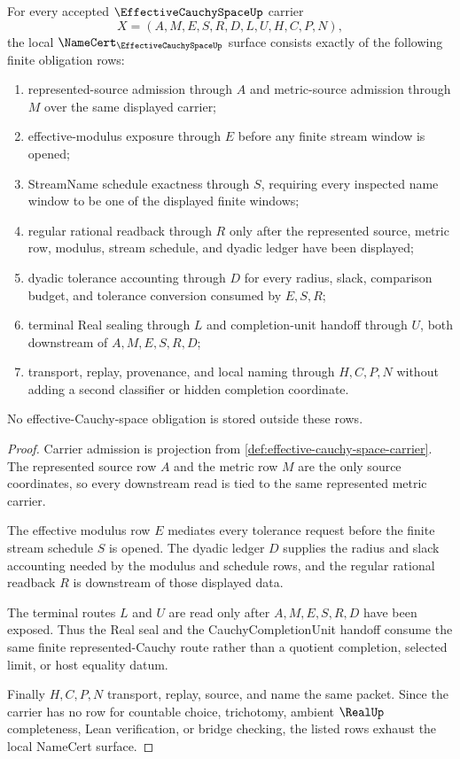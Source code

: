 \begin{theorem}\label{thm:effective-cauchy-space-namecert-obligations}
For every accepted $\EffectiveCauchySpaceUp$ carrier
$$
X=(A,M,E,S,R,D,L,U,H,C,P,N),
$$
the local $\NameCert_{\EffectiveCauchySpaceUp}$ surface consists exactly of the following finite obligation rows:
\begin{enumerate}
\item represented-source admission through $A$ and metric-source admission through $M$ over the same displayed carrier;
\item effective-modulus exposure through $E$ before any finite stream window is opened;
\item StreamName schedule exactness through $S$, requiring every inspected name window to be one of the displayed finite windows;
\item regular rational readback through $R$ only after the represented source, metric row, modulus, stream schedule, and dyadic ledger have been displayed;
\item dyadic tolerance accounting through $D$ for every radius, slack, comparison budget, and tolerance conversion consumed by $E,S,R$;
\item terminal Real sealing through $L$ and completion-unit handoff through $U$, both downstream of $A,M,E,S,R,D$;
\item transport, replay, provenance, and local naming through $H,C,P,N$ without adding a second classifier or hidden completion coordinate.
\end{enumerate}
No effective-Cauchy-space obligation is stored outside these rows.
\end{theorem}
\begin{proof}
Carrier admission is projection from \autoref{def:effective-cauchy-space-carrier}. The represented source row $A$ and the metric row $M$ are the only source coordinates, so every downstream read is tied to the same represented metric carrier.

The effective modulus row $E$ mediates every tolerance request before the finite stream schedule $S$ is opened. The dyadic ledger $D$ supplies the radius and slack accounting needed by the modulus and schedule rows, and the regular rational readback $R$ is downstream of those displayed data.

The terminal routes $L$ and $U$ are read only after $A,M,E,S,R,D$ have been exposed. Thus the Real seal and the CauchyCompletionUnit handoff consume the same finite represented-Cauchy route rather than a quotient completion, selected limit, or host equality datum.

Finally $H,C,P,N$ transport, replay, source, and name the same packet. Since the carrier has no row for countable choice, trichotomy, ambient $\RealUp$ completeness, Lean verification, or bridge checking, the listed rows exhaust the local NameCert surface.
\end{proof}

